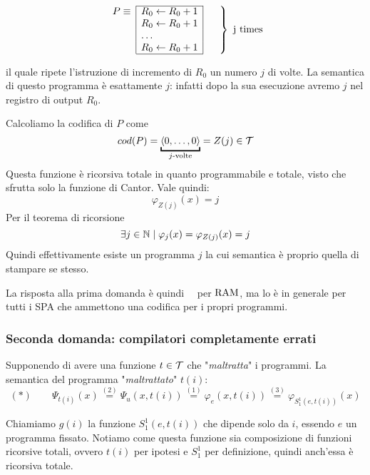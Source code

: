 \begin{center}
\[
\begin{array}{r|l|}
    \cline{2-2}
    P \equiv & R_0 \leftarrow R_0 + 1 \\
            & R_0 \leftarrow R_0 + 1 \\
            & \dots \\
            & R_0 \leftarrow R_0 + 1 \\
    \cline{2-2}
\end{array}
\left.
\begin{array}{c}
~ \\
~ \\
~ \\
~
\end{array}
\right\} \text{ j times}
\]
\end{center}

il quale ripete l'istruzione di incremento di $R_0$ un numero $j$ di volte. La semantica di questo programma è esattamente $j$: infatti dopo la sua esecuzione avremo $j$ nel registro di output $R_0$.

Calcoliamo la codifica di $P$ come
$$ cod(P) = \underbracket{\langle 0, \dots, 0 \rangle}_{j\text{-volte}} = Z (j) \in \T $$
Questa funzione è ricorsiva totale in quanto programmabile e totale, visto che sfrutta solo la funzione di Cantor. Vale quindi:
$$ \varphi_{Z(j)} (x) = j $$
Per il teorema di ricorsione
$$ \exists j \in \mathbb{N} \mid \varphi_j (x) = \varphi_{Z (j)} (x) = j $$
Quindi effettivamente esiste un programma $j$ la cui semantica è proprio quella di stampare se stesso.

La risposta alla prima domanda è quindi \si\ per $\text{RAM}$, ma lo è in generale per tutti i SPA che ammettono una codifica per i propri programmi.

\subsubsection{Seconda domanda: compilatori completamente errati}

Supponendo di avere una funzione $t \in \mathcal{T}$ che "\textit{maltratta}" i programmi. La semantica del programma "\textit{maltrattato}" $t(i)$:
$$ (\ast) \quad \quad \Psi_{t(i)} (x) \stackrel{(2)}{=} \Psi_u (x, t(i)) \stackrel{(1)}{=} \varphi_e (x, t(i)) \stackrel{(3)}{=} \varphi_{S_1^1 (e,t(i))} (x) $$

Chiamiamo $g(i)$ la funzione $S_1^1 (e, t(i))$ che dipende solo da $i$, essendo $e$ un programma fissato. Notiamo come questa funzione sia composizione di funzioni ricorsive totali, ovvero $t(i)$ per ipotesi e $S^1_1$ per definizione, quindi anch'essa è ricorsiva totale.

